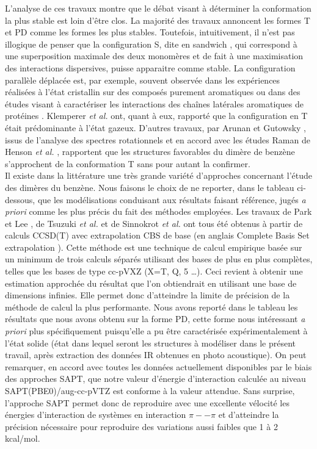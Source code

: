 	L’analyse de ces travaux montre que le débat visant à déterminer la conformation la plus stable est loin d’être clos. La majorité des travaux annoncent les formes T et PD comme les formes les plus stables. Toutefois, intuitivement, il n'est pas illogique de penser que la configuration S, dite \og en sandwich \fg, qui correspond à une superposition maximale des deux monomères et de fait à une maximisation des interactions dispersives, puisse apparaitre comme stable. La configuration parallèle déplacée est, par exemple, souvent observée dans les expériences réalisées à l’état cristallin sur des composés purement aromatiques \cite{hunter1991pi,fyfe1997synthetic,rebek1996assembly} ou dans des études visant à caractériser les interactions des chaînes latérales aromatiques de protéines \cite{hunter1991pi,burley1985aromatic}. Klemperer \textit{et al.} \cite{janda1975benzene} ont, quant à eux, rapporté que la configuration en T était prédominante à l’état gazeux. D’autres travaux, par Arunan et Gutowsky \cite{arunan1993rotational}, issus de l'analyse des spectres rotationnels et en accord avec les études Raman de Henson \textit{et al.} \cite{henson1992raman}, rapportent que les structures favorables du dimère de benzène s’approchent de la conformation T sans pour autant la confirmer.\\ 
	
	
	Il existe dans la littérature une très grande variété d’approches concernant l’étude des dimères du benzène. Nous faisons le choix de ne reporter, dans le tableau ci-dessous, que les modélisations conduisant aux résultats faisant référence, jugés \textit{a priori} comme les plus précis du fait des méthodes employées. Les travaux de Park et Lee \cite{park2006accurate}, de Tsuzuki \textit{et al.} \cite{tsuzuki2002origin} et de Sinnokrot \textit{et al.} \cite{hobza1996potential} ont tous été obtenus à partir de calculs CCSD(T) avec extrapolation CBS de base (en anglais \og Complete Basis Set extrapolation \fg). Cette méthode est une technique de calcul empirique basée sur un minimum de trois calculs séparés utilisant des bases de plus en plus complètes, telles que les bases de type cc-pVXZ (X=T, Q, 5 …). Ceci revient à obtenir une estimation approchée du résultat que l'on obtiendrait en utilisant une base de dimensions infinies. Elle permet donc d’atteindre la limite de précision de la méthode de calcul la plus performante. Nous avons reporté dans le tableau les résultats que nous avons obtenu sur la forme PD, cette forme nous intéressant \textit{a priori} plus spécifiquement puisqu'elle a pu être caractérisée expérimentalement à l'état solide (état dans lequel seront les structures à modéliser dans le présent travail, après extraction des données IR obtenues en photo acoustique). On peut remarquer, en accord avec toutes les données actuellement disponibles par le biais des approches SAPT, que notre valeur d’énergie d’interaction calculée au niveau SAPT(PBE0)/aug-cc-pVTZ est conforme à la valeur attendue. Sans surprise, l’approche SAPT permet donc de reproduire avec une excellente vélocité les énergies d’interaction de systèmes en interaction $\pi--\pi$ et d’atteindre la précision nécessaire pour reproduire des variations aussi faibles que 1 à 2 kcal/mol.
	
